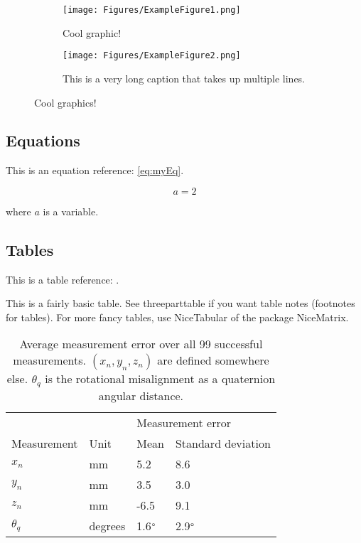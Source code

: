 \begin{figure}[!htb]
	\centering
    \begin{subfigure}[t]{0.49\textwidth}
        \centering
		\texttt{[image: Figures/ExampleFigure1.png]}
	    \caption{Cool graphic!}
        \label{fig:Example4a}
    \end{subfigure}
    \begin{subfigure}[t]{0.49\textwidth}
        \centering
		\texttt{[image: Figures/ExampleFigure2.png]}
	    \caption{This is a very long caption that takes up multiple lines.}
        \label{fig:Example4b}
    \end{subfigure}
    \caption{Cool graphics!}
    \label{fig:Example4}
\end{figure}


\subsection{Equations}
This is an equation reference: \eqref{eq:myEq}.

\begin{equation} \label{eq:myEq}
    a = 2
\end{equation}

where $a$ is a variable.


\subsection{Tables}

This is a table reference: .

This is a fairly basic table. See threeparttable if you want table notes (footnotes for tables). For more fancy tables, use NiceTabular of the package NiceMatrix.

\begin{table}[!h]
    \centering
    \begin{tabular}{llll}
        \hline
        & & \multicolumn{2}{l}{Measurement error}\\
        Measurement & Unit & Mean & Standard deviation\\
        \hline
        $x_n$ & mm & 5.2 & 8.6\\
        $y_n$ & mm & 3.5 & 3.0\\
        $z_n$ & mm & -6.5 & 9.1\\
        $\theta_q$ & degrees & 1.6$\degree$ & 2.9$\degree$\\
        \hline
        \end{tabular}
    \caption{Average measurement error over all 99 successful measurements. $(x_n, y_n, z_n)$ are defined somewhere else. $\theta_q$ is the rotational misalignment as a quaternion angular distance.}
    \label{tb:myTable}
\end{table}


